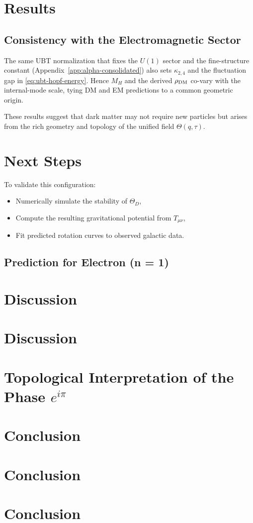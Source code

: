 \documentclass[12pt,a4paper]{article}
\numberwithin{equation}{section}
\theoremstyle{definition}
\theoremstyle{remark}
\begin{document}
\section{Results}
\subsection{Consistency with the Electromagnetic Sector}
The same UBT normalization that fixes the $U(1)$ sector and the fine-structure constant (Appendix~\ref{app:alpha-consolidated}) also sets $\kappa_{2,4}$ and the fluctuation gap in \eqref{eq:ubt-hopf-energy}.
Hence $M_H$ and the derived $\rho_{\rm DM}$ co-vary with the internal-mode scale, tying DM and EM predictions to a common geometric origin.

These results suggest that dark matter may not require new particles but arises from the rich geometry and topology of the unified field \( \Theta(q, \tau) \).

\section{Next Steps}
To validate this configuration:
\begin{itemize}
    \item Numerically simulate the stability of \(\Theta_D\),
    \item Compute the resulting gravitational potential from \(T_{\mu\nu}\),
    \item Fit predicted rotation curves to observed galactic data.
\end{itemize}

\subsection*{Prediction for Electron (n = 1)}

\section{Discussion}
\section{Discussion}

\section{Topological Interpretation of the Phase \( e^{i\pi} \)}

\section{Conclusion}
\section*{Conclusion}

\section{Conclusion}
\end{document}
